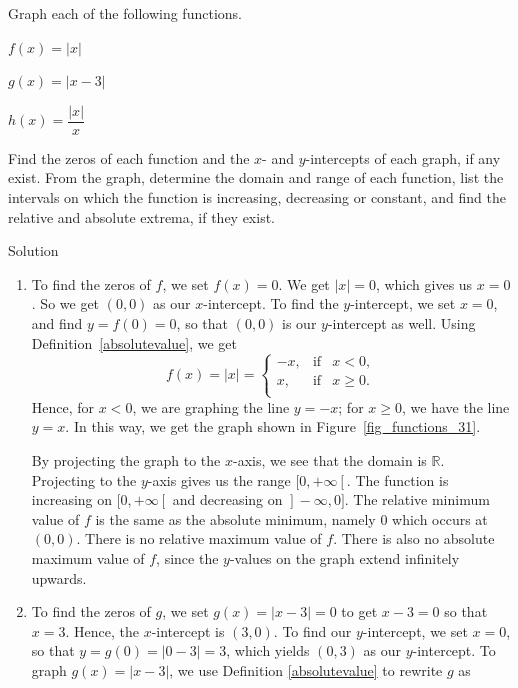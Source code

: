 \begin{example}
Graph each of the following functions.  
\begin{enumerate}
\begin{multicols}{2}
\item  $f(x) = |x|$
\ifvc \item  $g(x) = |x-3|$\fi
\ifcourse \item  $h(x) = \dfrac{|x|}{x}$ \fi
\end{multicols}
\end{enumerate}
Find the zeros of each function and the $x$- and $y$-intercepts of  each graph, if any exist.  From the graph, determine the domain and range of each function, list the intervals on which the function is increasing, decreasing  or constant, and find the relative and absolute extrema, if they exist.

Solution 

\begin{enumerate}

\item  To find the zeros of $f$, we set $f(x)= 0$.  We get $|x|=0$, which gives us $x=0$.  So we get $(0,0)$ as our $x$-intercept.  To find the $y$-intercept, we set $x=0$, and find $y = f(0) = 0$, so that $(0,0)$ is our $y$-intercept as well. Using Definition~\ref{absolutevalue}, we get 
\[ f(x) = |x| =  \left\{ \begin{array}{rcl} -x, & \mbox{if} & x < 0,  \\ x, & \mbox{if} & x \geq 0. \\ \end{array} \right.\]  
Hence, for $x < 0$, we are graphing the line $y = -x$;  for $x \geq 0$, we have the line $y = x$.  In this way, we get the graph shown in Figure~\ref{fig_functions_31}.

By projecting the graph to the $x$-axis, we see that the domain is $\mathbb{R}$.  Projecting to the $y$-axis gives us the range $[0,+\infty\left[\right.$.  The function is increasing on $[0,+\infty\left[\right.$ and decreasing on $\left.\right]-\infty,0]$.  The relative minimum value of $f$ is the same as the absolute minimum, namely $0$ which occurs at $(0,0)$.  There is no relative maximum value of $f$.  There is also no absolute maximum value of $f$, since the $y$-values on the graph extend infinitely upwards.



\ifvc\item  To find the zeros of $g$, we set $g(x) = |x-3|=0$ to get $x-3=0$ so that $x=3$.  Hence, the $x$-intercept is $(3,0)$.  To find our $y$-intercept, we set $x=0$, so that $y = g(0) = |0-3| = 3$, which yields $(0,3)$ as our $y$-intercept.  To graph $g(x) = |x-3|$, we use Definition \ref{absolutevalue} to rewrite $g$ as


\end{enumerate}
\end{example}
